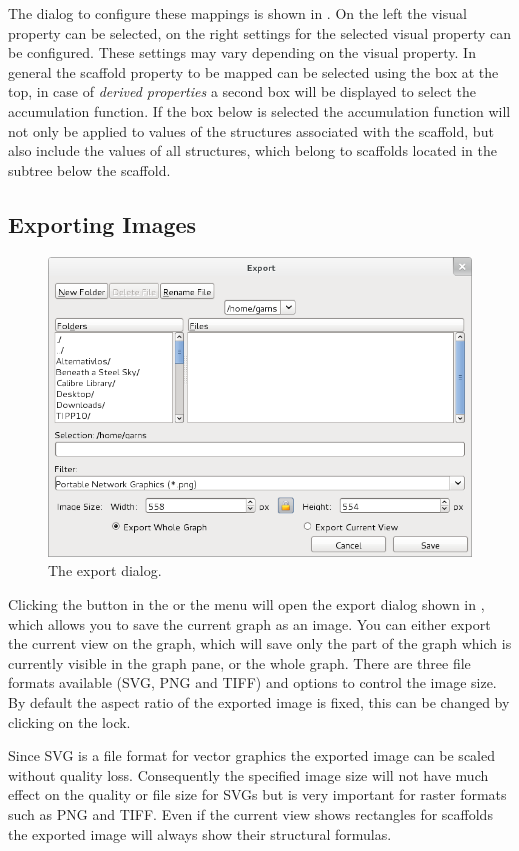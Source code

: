 The dialog to configure these mappings is shown in
. On the left the visual property can be
selected, on the right settings for the selected visual property can be
configured. These settings may vary depending on the visual property. In general
the scaffold property to be mapped can be selected using the box at the top, in
case of \emph{derived properties} a second box will be displayed to select the
accumulation function. If the box  below
is selected the accumulation function will not only be applied to values of
the structures associated with the scaffold, but also include the
values of all structures, which belong to scaffolds located in the subtree below
the scaffold.

\subsection{Exporting Images}
\label{sec:treeview:imageexport}

\begin{figure}[p]
\centering
\includegraphics[scale=0.5]{images/stree/export.png}
\caption{The export dialog.}
\label{fig:treeview:export}
\end{figure}
Clicking the  button in the \tbar or the  menu
will open the export dialog shown in , which
allows you to save the current graph as an image. You can either  export the
current view on the graph, which will save only the part of the graph
which is currently visible in the graph pane, or the whole graph. There are
three file formats available (SVG, PNG and TIFF) and options to control the
image size. By default the aspect ratio of the exported image is fixed, this can
be changed by clicking on the lock.

Since SVG is a file format for vector graphics the exported image can
be scaled without quality loss. Consequently the specified image size will not
have much effect on the quality or file size for SVGs but is very important for
raster formats such as PNG and TIFF. Even if the current view shows rectangles
for scaffolds the exported image will always show their structural formulas. 

\newpage
